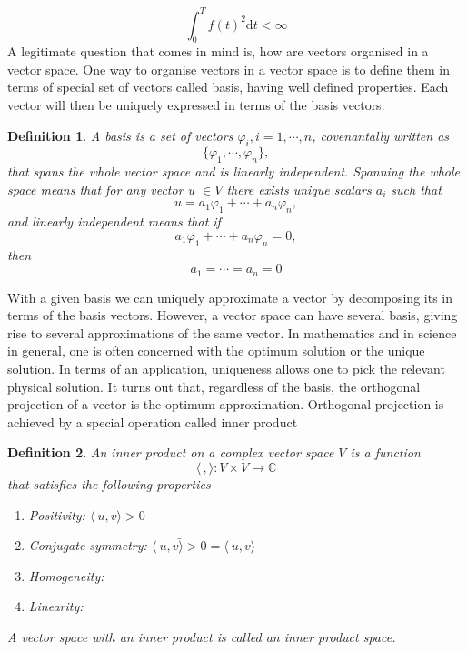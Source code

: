 \documentclass[11pt, oneside]{article}   	%
\newtheorem{definition}{Definition}
\begin{document}
\begin{equation}
\int_{0}^{T}f(t)^{2}\mathrm{d}t < \infty
\end{equation}
\justify
A legitimate question that comes in mind is, how are vectors organised in a vector space. One way to organise vectors in a vector space is to define them in terms of special set of vectors called basis, having well defined properties. Each vector will then be uniquely expressed in terms of the basis vectors. 
\justify
\begin{definition}
A basis is a set of vectors $\varphi_{i}, i = 1, \cdots, n$, covenantally written as 
\begin{equation}
\{ \varphi_{1}, \cdots, \varphi_{n} \} \nonumber,
\end{equation}
that spans the whole vector space and is linearly independent. Spanning the whole space means that for any vector u $\in V$ there exists unique scalars $a_{i}$ such that 
\begin{equation}
u = a_{1}\varphi_{1} + \cdots + a_{n}\varphi_{n} \nonumber,
\end{equation}
and linearly independent means that if
\begin{equation}
a_{1}\varphi_{1} + \cdots + a_{n}\varphi_{n} = 0 \nonumber,
\end{equation}
then 
\begin{equation}
a_{1} = \cdots = a_{n} = 0 \nonumber
\end{equation}
\end{definition}
\justify
With a given basis we can uniquely approximate a vector by decomposing its in terms of the basis vectors. However, a vector space can have several basis, giving rise to several approximations of the same vector. In mathematics and in science in general, one is often concerned with the optimum solution or the unique solution. In terms of an application, uniqueness allows one to pick the relevant physical solution.
It turns out that, regardless of the basis, the orthogonal projection of a vector is the optimum approximation. Orthogonal projection is achieved by a special operation called inner product

\begin{definition}
An inner product on a complex vector space $V$ is a function 
\begin{equation}
\langle\,,\rangle : V\times V \rightarrow \mathbb{C} \nonumber
\end{equation}
that satisfies the following properties
\begin{enumerate}
\item Positivity: $\langle\ u,v \rangle > 0$
\item Conjugate symmetry: $\bar{\langle\ u,v \rangle > 0}  = \langle\ u,v \rangle$
\item Homogeneity:
\item Linearity:
\end{enumerate}
A vector space with an inner product is called an inner product space.
\end{definition}
\end{document}
